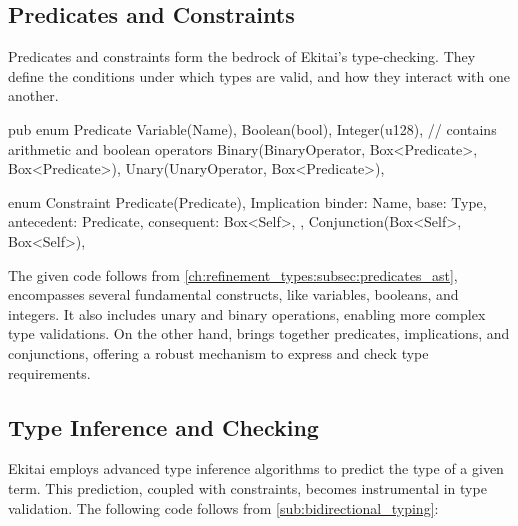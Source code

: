 \documentclass[
  oneside,
  english,
  coorientadorbanca,
  noabntexcite
]{ufsc-thesis-rn46-2019}
\newcommand{\codett}[1]{\text{\scpfamily#1}}
\newcommand{\bnfvar}[1]{\codett{#1}}
\begin{document}
\subsection{Predicates and Constraints}

Predicates and constraints form the bedrock of Ekitai's type-checking. They define the conditions under which types are valid, and how they interact with one another.

\begin{rustcode}
pub enum Predicate {
  Variable(Name),
  Boolean(bool),
  Integer(u128),
  // contains arithmetic and boolean operators
  Binary(BinaryOperator, Box<Predicate>, Box<Predicate>),
  Unary(UnaryOperator, Box<Predicate>),
}

enum Constraint {
  Predicate(Predicate),
  Implication {
    binder: Name,
    base: Type,
    antecedent: Predicate,
    consequent: Box<Self>,
  },
  Conjunction(Box<Self>, Box<Self>),
}
\end{rustcode}

The given code follows from \cref{ch:refinement_types:subsec:predicates_ast}, \bnfvar{Predicate} encompasses several fundamental constructs, like variables, booleans, and integers.
It also includes unary and binary operations, enabling more complex type validations.
On the other hand, \bnfvar{Constraint} brings together predicates, implications, and conjunctions, offering a robust mechanism to express and check type requirements.

\subsection{Type Inference and Checking}

Ekitai employs advanced type inference algorithms to predict the type of a given term. This prediction, coupled with constraints, becomes instrumental in type validation. The following code follows from \autoref{sub:bidirectional_typing}:
\end{document}
